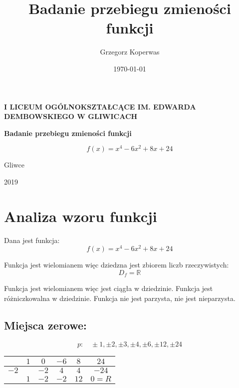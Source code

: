 \documentclass[a4paper,12pt]{article}
\title{Badanie przebiegu zmieności funkcji}
\author{Grzegorz Koperwas}
\date{\today}
\begin{document}
\begin{titlepage}
	\begin{center}
		\Large{\textbf{I LICEUM OGÓLNOKSZTAŁCĄCE IM. EDWARDA DEMBOWSKIEGO W GLIWICACH}}

		\vspace{3cm}

		\theauthor

		\vspace{2.5cm}

		\textbf{Badanie przebiegu zmieności funkcji}

		\[f \left( x \right) = x^4 - 6x^2 + 8x + 24 \]

		\vfill

		Gliwce
		\vspace{0.5cm}

		\titlerule
		\vspace{0.6cm}

		2019

	\end{center}

\end{titlepage}

\section{Analiza wzoru funkcji}

Dana jest funkcja:
\[ f \left( x \right) = x^4  - 6x^2 + 8x + 24 \]

Funkcja jest wielomianem więc dziedzna jest zbiorem liczb rzeczywistych:
\[D_f = \mathbb{R} \]

Funkcja jest wielomianem więc jest ciągła w dziedzinie. Funkcja jest różniczkowalna w dziedzinie. Funkcja nie jest parzysta, nie jest nieparzysta.
\subsection{Miejsca zerowe:}
\[ p: \quad \pm 1, \pm 2, \pm 3, \pm 4, \pm 6, \pm 12, \pm 24\]

\begin{center}
	
\begin{tabular}{l|c|c|c|c|c}
                           & $1$ & $0$  & $-6$ & $8$  & $24$    \\ \hline

		$-2$ &     & $-2$ & $4$  & $4$  & $-24$   \\ \hline

                           & $1$ & $-2$ & $-2$ & $12$ & $0 = R$ \\  

\end{tabular}
\end{center}
\end{document}
